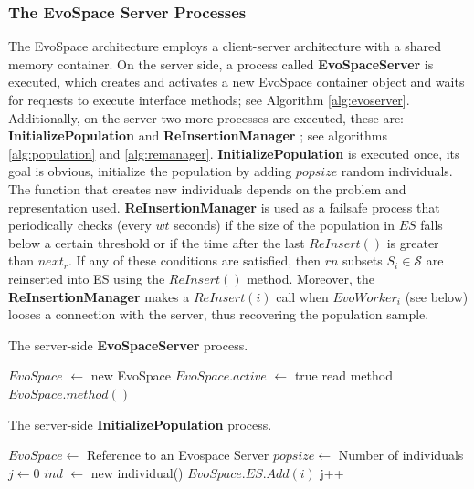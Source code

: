 \subsubsection{The EvoSpace Server Processes}
The EvoSpace architecture employs a client-server architecture with a shared memory container.
On the server side, a process called \textbf{EvoSpaceServer} is executed, which creates and activates a new EvoSpace
container object and waits for requests to execute interface methods; see Algorithm \ref{alg:evoserver}.
Additionally, on the server two more processes are executed, these are: \textbf{InitializePopulation} and \textbf{ReInsertionManager} ;
see algorithms \ref{alg:population} and \ref{alg:remanager}.
\textbf{InitializePopulation} is executed once, its goal is obvious, initialize the population by adding $popsize$ random
individuals. The function that creates new individuals depends on the problem and representation used.
\textbf{ReInsertionManager} is used as a failsafe process that periodically checks (every $wt$ seconds) if the size of the population in $ES$
falls below a certain threshold or if the time after the last $ReInsert()$ is greater than $next_r$.
If any of these conditions are satisfied, then $rn$ subsets $S_i \in \mathcal{S}$ are reinserted into ES using the $ReInsert()$ method.
Moreover, the \textbf{ReInsertionManager} makes a $ReInsert(i)$ call when $EvoWorker_i$ (see below) looses a connection with the server,
thus recovering the population sample.
\begin{algorithm}[t]
\label{alg:evoserver}
\caption{The server-side \textbf{EvoSpaceServer} process.}
\begin{algorithmic}
\STATE $EvoSpace$ $\leftarrow$ new EvoSpace
\STATE $EvoSpace.active$ $\leftarrow$ true
\STATE read method
\RETURN $EvoSpace.method()$
\ENDWHILE
\end{algorithmic}
\end{algorithm}


\begin{algorithm}[t]
\label{alg:population}
\caption{The server-side \textbf{InitializePopulation} process.}
\begin{algorithmic}
\REQUIRE $EvoSpace \leftarrow$ Reference to an Evospace Server
\REQUIRE $popsize \leftarrow$ Number of individuals
\STATE $j \leftarrow 0$
\STATE $ind$ $\leftarrow$ new individual() 
\STATE $EvoSpace.ES.Add(i)$
\STATE j++
\ENDFOR
\end{algorithmic}
\end{algorithm}

